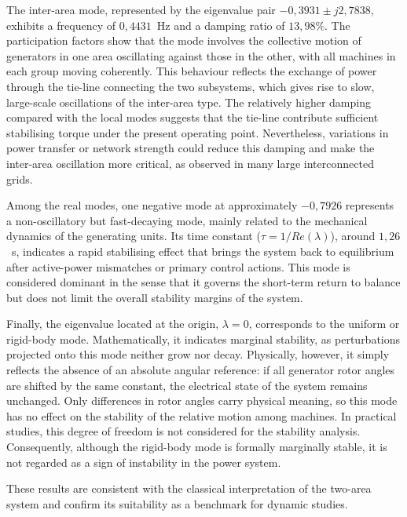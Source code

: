 The inter-area mode, represented by the eigenvalue pair $-0,3931 \pm j2,7838$, exhibits a frequency of  $0,4431$~Hz and a damping 
ratio of $13,98\%$. The participation factors show that the mode involves the collective motion of generators in one area oscillating 
against those in the other, with all machines in each group moving coherently. This behaviour reflects the exchange of power 
through the tie-line connecting the two subsystems, which gives rise to slow, large-scale oscillations of the inter-area type. 
The relatively higher damping compared with the local modes suggests that the tie-line 
contribute sufficient stabilising torque under the present operating point. Nevertheless, variations in power transfer or network 
strength could reduce this damping and make the inter-area oscillation more critical, as observed in many large interconnected grids.

Among the real modes, one negative mode at approximately $-0,7926$ represents a non-oscillatory but fast-decaying mode, 
mainly related to the mechanical dynamics of the generating units. Its time constant ($\tau = 1/Re(\lambda)$), around $1,26$~s, indicates a rapid stabilising
effect that brings the system back to equilibrium after active-power mismatches or primary control actions. This mode is considered 
dominant in the sense that it governs the short-term return to balance but does not limit the overall stability margins of the system.

Finally, the eigenvalue located at the origin, $\lambda = 0$, corresponds to the uniform or rigid-body mode. 
Mathematically, it indicates marginal stability, as perturbations projected onto this mode neither grow nor decay.
Physically, however, it simply reflects the absence of an absolute angular reference: if all generator rotor angles are shifted by the same constant, 
the electrical state of the system remains unchanged. Only differences in rotor angles carry physical meaning, so this mode has no effect on the stability 
of the relative motion among machines. In practical studies, this degree of freedom is not considered for the stability analysis. 
Consequently, although the rigid-body mode is formally marginally stable, it is not regarded as a sign of instability in the power system.
 
These results are consistent with the classical interpretation of the two-area system and confirm its suitability as a benchmark
 for dynamic studies.



